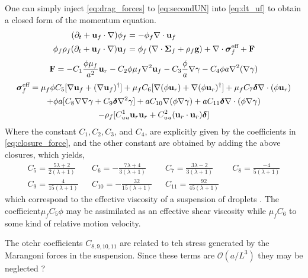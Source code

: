 One can simply inject \ref{eq:drag_forces} to \ref{eq:secondUN} into \ref{eq:dt_uf} to obtain a closed form of the momentum equation. 
\begin{align}
    (\partial_t + \textbf{u}_f  \cdot \mathbf{\nabla}) \phi_f
    &= - \phi_f \mathbf{\nabla}\cdot \textbf{u}_f\\
    \phi_f \rho_f(\partial_t + \textbf{u}_f  \cdot \mathbf{\nabla}) \textbf{u}_f
    &= \phi_f 
    \left(\mathbf{\nabla}\cdot \bm{\Sigma}_f
    + \rho_f \textbf{g}\right)
    + \mathbf{\nabla}\cdot \bm\sigma_f^\text{eff}
    + \textbf{F}
\end{align}
\begin{equation}
    \textbf{F}
    =
    - C_1 \frac{\phi \mu_f}{a^2}\textbf{u}_r 
    - C_2 \phi \mu_f\mathbf{\nabla}^2 \textbf{u}_f 
    - C_3 \frac{\phi}{a}\mathbf{\nabla} \gamma
    - C_4 \phi a\mathbf{\nabla}^2(\mathbf{\nabla} \gamma)
\end{equation}
\begin{multline}
    \bm\sigma_f^\text{eff}
    =
    \mu_f \phi C_5 [\mathbf{\nabla} \textbf{u}_f+ (\mathbf{\nabla} \textbf{u}_f)^\dagger]
    + \mu_f C_6 [
    \mathbf{\nabla}(\phi \textbf{u}_r)
    + \mathbf{\nabla}(\phi \textbf{u}_r)^\dagger]
    + \mu_f C_7 \bm\delta \mathbf{\nabla}\cdot(\phi \textbf{u}_r)\\
    + \phi a [C_8 \mathbf{\nabla}\mathbf{\nabla} \gamma + C_9 \bm\delta \mathbf{\nabla}^2 \gamma]
    + a C_{10} \mathbf{\nabla}(\phi \mathbf{\nabla}\gamma)
    + a C_{11} \bm\delta \mathbf{\nabla}\cdot(\phi \mathbf{\nabla}\gamma)\\
    - \rho_f [C_{uu}^1 \textbf{u}_{r} \textbf{u}_{r}
    + C_{uu}^2 (\textbf{u}_{r}\cdot  \textbf{u}_{r})\bm\delta]
\end{multline}
Where the constant $C_1,C_2,C_3$, and $C_4$, are explicitly given by the coefficients in \ref{eq:closure_force}, and the other constant are obtained by adding the above closures, which yields, 
\begin{align}
    C_5 = \frac{5\lambda +2}{2(\lambda+1)} &&
    C_6 = -\frac{7\lambda +4}{3(\lambda+1)} &&
    C_7 = \frac{3\lambda - 2}{3(\lambda+1)} &&
    C_8 = \frac{-4}{5(\lambda+1)} \\
    C_9 = \frac{4}{15(\lambda+1)} &&
    C_{10} = -\frac{32}{15(\lambda+1)} &&
    C_{11} = \frac{92}{45(\lambda+1)} &&
\end{align}
which correspond to the effective viscosity of a suspension of droplets \citet{zhang1997momentum}. 
The coefficient$\mu_f C_5 \phi$ may be assimilated as an effective shear viscosity while $\mu_f C_6$ to some kind of relative motion velocity. 

The otehr coefficients $C_{8,9,10,11}$ are related to teh  stress generated by the Marangoni forces in the suspension. 
Since these terms are $\mathcal{O}(a/L^3)$ they may be neglected ? 

